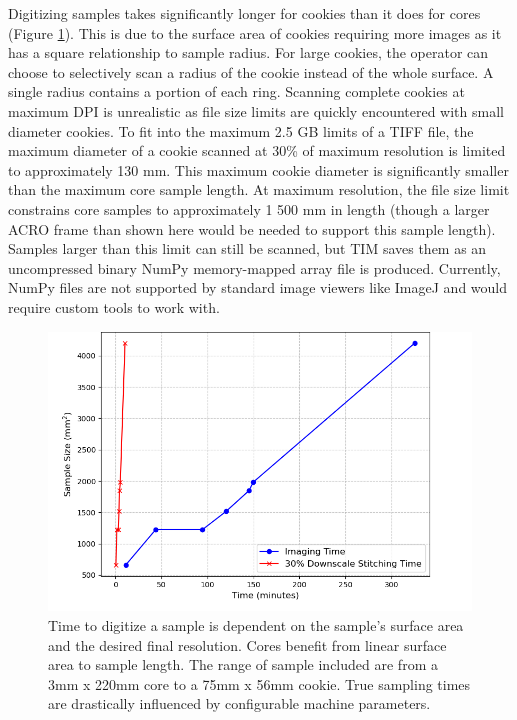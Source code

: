 \documentclass[a4paper,12pt]{article}
\begin{document}
Digitizing samples takes significantly longer for cookies than it does for cores (Figure \ref{fig:digitization_time}). This is due to the surface area of cookies requiring more images as it has a square relationship to sample radius.
For large cookies, the operator can choose to selectively scan a radius of the cookie instead of the whole surface. A single radius contains a portion of each ring. Scanning complete cookies at maximum DPI is unrealistic as file size limits are quickly encountered with small diameter cookies. 
To fit into the maximum 2.5 GB limits of a TIFF file, the maximum diameter of a cookie scanned at 30\% of maximum resolution is limited to approximately 130 mm. This maximum cookie diameter is significantly smaller than the maximum core sample length. At maximum resolution, the file size limit 
constrains core samples to approximately 1 500 mm in length (though a larger ACRO frame than shown here would be needed to support this sample length). Samples larger than this limit can still be scanned, but TIM saves them as an uncompressed binary NumPy memory-mapped array file is produced. Currently, NumPy files are not supported by standard image viewers like ImageJ and would require custom tools to work with. %

\begin{figure}
    \centering
    \includegraphics[height=0.5\linewidth]{../../code/plots/time_and_area.png}
    \caption{Time to digitize a sample is dependent on the sample's surface area and the desired final resolution.
    Cores benefit from linear surface area to sample length. The range of sample included are from a 3mm x 220mm core to a 75mm x 56mm cookie. True sampling times are drastically influenced by configurable machine parameters.} 
    \label{fig:digitization_time}
\end{figure}
\end{document}

